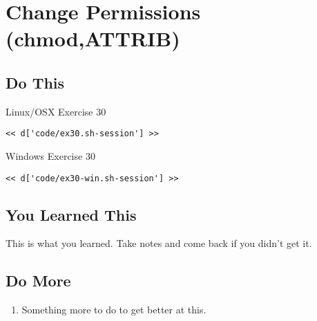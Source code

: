 \chapter{Change Permissions (chmod,ATTRIB)}

\section{Do This}

\begin{code}{Linux/OSX Exercise 30}
\begin{Verbatim}
<< d['code/ex30.sh-session'] >>
\end{Verbatim}
\end{code}

\begin{code}{Windows Exercise 30}
\begin{Verbatim}
<< d['code/ex30-win.sh-session'] >>
\end{Verbatim}
\end{code}

\section{You Learned This}

This is what you learned.  Take notes and come back if you didn't get it.

\section{Do More}

\begin{enumerate}
\item Something more to do to get better at this.
\end{enumerate}

